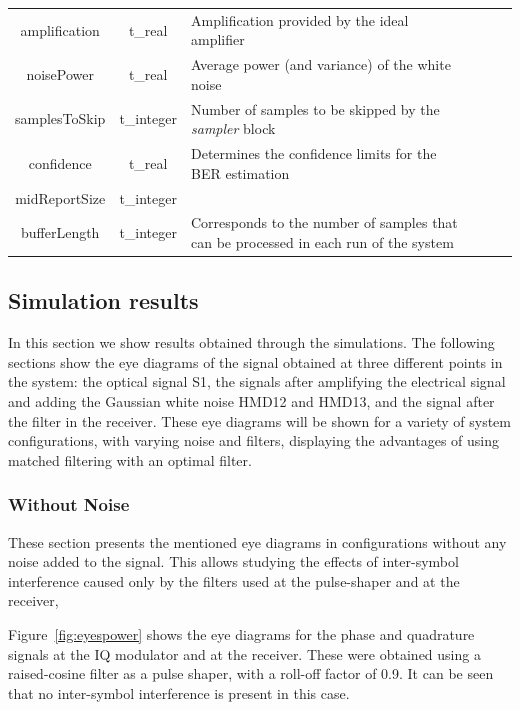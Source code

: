 \begin{refsection}
\begin{table}[H]
\begin{tabular}{|c|c|p{70mm}|ccp{70mm}}
		amplification & t\_real & Amplification provided by the ideal amplifier &    \\ \cline{1-3}
		noisePower & t\_real & Average power (and variance) of the white noise &    \\ \cline{1-3}
		samplesToSkip & t\_integer & Number of samples to be skipped by the \textit{sampler} block &    \\ \cline{1-3}
		confidence & t\_real & Determines the confidence limits for the BER estimation &    \\ \cline{1-3}
		midReportSize & t\_integer &  &    \\ \cline{1-3}
		bufferLength & t\_integer & Corresponds to the number of samples that can be processed in each run of the system &    \\ \cline{1-3}
		\end{tabular}
		\label{table:in_par}
		\end{table}

\subsection*{Simulation results}

In this section we show results obtained through the simulations. The
following sections show the eye diagrams of the signal obtained at three
different points in the system: the optical signal S1, the signals after
amplifying the electrical signal and adding the Gaussian white noise HMD12 and
HMD13, and the signal after the filter in the receiver. These eye diagrams will
be shown for a variety of system configurations, with varying noise and
filters, displaying the advantages of using matched filtering with an optimal
filter.

\subsubsection{Without Noise}

These section presents the mentioned eye diagrams in configurations without any
noise added to the signal. This allows studying the effects of inter-symbol
interference caused only by the filters used at the pulse-shaper and at the
receiver,

Figure~\ref{fig:eyespower} shows the eye diagrams for the phase and quadrature 
signals at the IQ modulator and at the receiver. These were obtained using
a raised-cosine filter as a pulse shaper, with a roll-off factor of 0.9. It can
be seen that no inter-symbol interference is present in this case.


\end{refsection}

